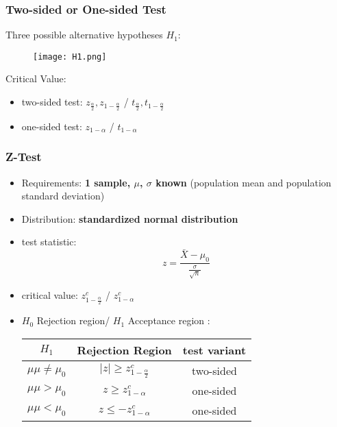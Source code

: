 \subsubsection{Two-sided or One-sided Test}
Three possible alternative hypotheses $H_1$:
\begin{figure}[H]
	\centering
	\texttt{[image: H1.png]}
\end{figure}
Critical Value:
\begin{itemize}
	\item two-sided test: $z_{\frac{\alpha}{2}}, z_{1-\frac{\alpha}{2}}$ / $t_{\frac{\alpha}{2}}, t_{1-\frac{\alpha}{2}}$
	\item one-sided test: $z_{1-\alpha}$ / $t_{1-\alpha}$
\end{itemize}



\subsubsection{Z-Test}
\begin{itemize}
	\item Requirements: \textbf{1 sample, $\mu$, $\sigma$ known} (population mean and population standard deviation)  
	\item Distribution: \textbf{standardized normal distribution}
	\item test statistic: \large{$$ z = \frac{\bar{X} - \mu_0}{\frac{\sigma}{\sqrt{n}}}$$}
	\item critical value: $z^c_{1-\frac{\alpha}{2}}$ / $z^c_{1-\alpha}$
	\item $H_0$ Rejection region/ $H_1$ Acceptance region :
	
	\begin{table}[H]
		\begin{center}
			\begin{tabular}{|c|c|c|}
				\hline
				$H_1$ 				& Rejection Region					& test variant \\ \hline
				$\mu\mu \neq \mu_0$	& $|z| \geq z^c_{1-\frac{\alpha}{2}}$	& two-sided                 \\ \hline
				$\mu\mu > \mu_0$	& $ z \geq z^c_{1-\alpha}$			& one-sided                  \\ \hline
				$\mu\mu < \mu_0$	& $ z \leq -z^c_{1-\alpha} $			& one-sided                  \\ \hline
			\end{tabular}
		\end{center}
	\end{table} 	
\end{itemize}

